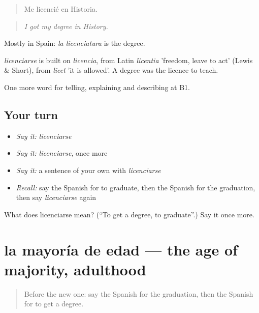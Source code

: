 \begin{quote}
Me licencié en Historia.
\end{quote}

\begin{quote}
\emph{I got my degree in History.}
\end{quote}

Mostly in Spain: \emph{la licenciatura} is the degree.

\begin{cousinweb}
\emph{licenciarse} is built on \emph{licencia}, from Latin \emph{licentia} 'freedom, leave to act' (Lewis \& Short), from \emph{licet} 'it is allowed'. A degree was the licence to teach.
\end{cousinweb}

\begin{grammarlens}[title={What you've built}]
One more word for telling, explaining and describing at B1.
\end{grammarlens}

\subsection*{Your turn}
\begin{itemize}
\raggedright
  \item \emph{Say it:} \emph{licenciarse}
  \item \emph{Say it:} \emph{licenciarse}, once more
  \item \emph{Say it:} a sentence of your own with \emph{licenciarse}
  \item \emph{Recall:} say the Spanish for to graduate, then the Spanish for the graduation, then say \emph{licenciarse} again
\end{itemize}

\begin{tcolorbox}[breakable,colback=teal!4,colframe=teal!35!black,title={Before you move on}]
What does licenciarse mean? (\textquotedblleft{}To get a degree, to graduate\textquotedblright{}.) Say it once more.
\end{tcolorbox}
\section[la mayoría de edad]{la mayoría de edad — the age of majority, adulthood}

\label{lesson:ES-C554-mayoria-de-edad}



\begin{quote}
Before the new one: say the Spanish for the graduation, then the Spanish for to get a degree.
\end{quote}

